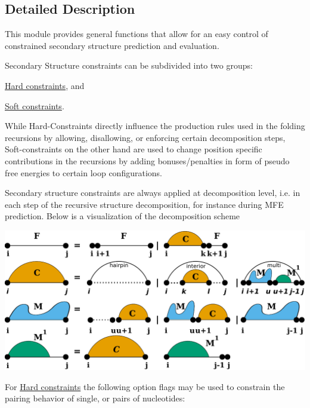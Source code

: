 \subsection{Detailed Description}
This module provides general functions that allow for an easy control of constrained secondary structure prediction and evaluation. 

Secondary Structure constraints can be subdivided into two groups\+:


\begin{DoxyItemize}
\item \hyperlink{group__hard__constraints}{Hard constraints}, and
\item \hyperlink{group__soft__constraints}{Soft constraints}.
\end{DoxyItemize}

While Hard-\/\+Constraints directly influence the production rules used in the folding recursions by allowing, disallowing, or enforcing certain decomposition steps, Soft-\/constraints on the other hand are used to change position specific contributions in the recursions by adding bonuses/penalties in form of pseudo free energies to certain loop configurations.

Secondary structure constraints are always applied at decomposition level, i.\+e. in each step of the recursive structure decomposition, for instance during M\+FE prediction. Below is a visualization of the decomposition scheme

 
\begin{DoxyImageNoCaption}
  \mbox{\includegraphics[width=\textwidth,height=\textheight/2,keepaspectratio=true]{recursions}}
\end{DoxyImageNoCaption}


For \hyperlink{group__hard__constraints}{Hard constraints} the following option flags may be used to constrain the pairing behavior of single, or pairs of nucleotides\+:


